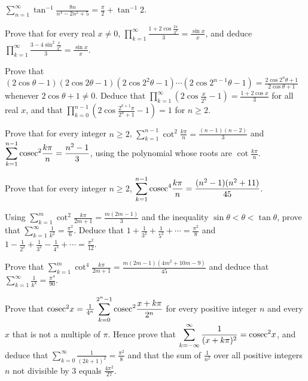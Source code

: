   $\displaystyle\sum_{n = 1}^\infty\tan^{-1}\frac{8n}{n^4 - 2n^2 + 5} = \frac{\pi}{2} + \tan^{-1}2$.
\item Prove that for every real $x\neq 0$, $\displaystyle\prod_{k = 1}^\infty\frac{1 + 2\cos\frac{2x}{3^k}}{3}
  = \frac{\sin x}{x}$, and deduce $\displaystyle\prod_{k = 1}^\infty\frac{3 - 4\sin^2\frac{x}{3^k}}{3}
  = \frac{\sin x}{x}$.
\item Prove that $(2\cos\theta - 1)(2\cos2\theta - 1)(2\cos2^2\theta - 1)\cdots(2\cos2^{n - 1}\theta - 1) =
  \frac{2\cos2^n\theta + 1}{2\cos\theta + 1}$ whenever $2\cos\theta + 1\neq 0$. Deduce that
  $\displaystyle\prod_{k = 1}^\infty\left(2\cos\frac{x}{2^k} - 1\right) = \frac{1 + 2\cos x}{3}$ for all
  real $x$, and that $\displaystyle\prod_{k = 0}^{n - 1}\left(2\cos\frac{2^{k + 1}\pi}{2^n + 1} - 1\right)
  = 1$ for $n\geq 2$.
\item Prove that for every integer $n\geq 2$, $\displaystyle\sum_{k = 1}^{n - 1}\cot^2\frac{k\pi}{n}
  = \frac{(n - 1)(n - 2)}{3}$ and $\displaystyle\sum_{k = 1}^{n - 1}{\rm cosec}^2\frac{k\pi}{n} = \frac{n^2
    - 1}{3}$, using the polynomial whose roots are $\cot\frac{k\pi}{n}$.
\item Prove that for every integer $n\geq 2$, $\displaystyle\sum_{k = 1}^{n - 1}{\rm cosec}^4\frac{k\pi}{n}
  = \frac{(n^2 - 1)(n^2 + 11)}{45}$.
\item Using $\displaystyle\sum_{k = 1}^m\cot^2\frac{k\pi}{2m + 1} = \frac{m(2m - 1)}{3}$ and the inequality
  $\sin\theta < \theta < \tan\theta$, prove that $\displaystyle\sum_{k = 1}^\infty\frac{1}{k^2}
  = \frac{\pi^2}{6}$. Deduce that $1 + \frac{1}{3^2} + \frac{1}{5^2} + \cdots = \frac{\pi^2}{8}$ and $1
  - \frac{1}{2^2} + \frac{1}{3^2} - \frac{1}{4^2} + \cdots = \frac{\pi^2}{12}$.
\item Prove that $\displaystyle\sum_{k = 1}^m\cot^4\frac{k\pi}{2m + 1} = \frac{m(2m - 1)(4m^2 + 10m -
    9)}{45}$ and deduce that $\displaystyle\sum_{k = 1}^\infty\frac{1}{k^4} = \frac{\pi^4}{90}$.
\item Prove that ${\rm cosec}^2x = \frac{1}{4^n}\displaystyle\sum_{k = 0}^{2^n - 1}{\rm cosec}^2\frac{x +
    k\pi}{2^n}$ for every positive integer $n$ and every $x$ that is not a multiple of $\pi$. Hence prove
  that $\displaystyle\sum_{k = -\infty}^{\infty}\frac{1}{(x + k\pi)^2} = {\rm cosec}^2x$, and deduce that
  $\displaystyle\sum_{k = 0}^\infty\frac{1}{(2k + 1)^2} = \frac{\pi^2}{8}$ and that the sum of
  $\frac{1}{n^2}$ over all positive integers $n$ not divisible by $3$ equals $\frac{4\pi^2}{27}$.
